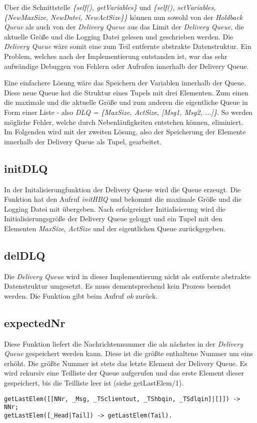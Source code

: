Über die Schnittstelle \textit{\{self(), getVariables\}} und \textit{\{self(), setVariables, \{NewMaxSize, NewDatei, NewActSize\}\}} können nun sowohl von der \textit{Holdback Queue} als auch von der \textit{Delivery Queue} aus das Limit der \textit{Delivery Queue}, die aktuelle Größe und die Logging Datei gelesen und geschrieben werden. Die \textit{Delivery Queue} wäre somit eine zum Teil entfernte abstrakte Datenstruktur. 
Ein Problem, welches nach der Implementierung entstanden ist, war das sehr aufwändige Debuggen von Fehlern oder Aufrufen innerhalb der Delivery Queue. 

Eine einfachere Lösung wäre das Speichern der Variablen innerhalb der Queue. 
Diese neue Queue hat die Struktur eines Tupels mit drei Elementen. Zum einen die maximale und die aktuelle Größe und zum anderen die eigentliche Queue in Form einer Liste - also \textit{DLQ = \{MaxSize, ActSize, [Msg1, Msg2, ...]\}}. So werden mögliche Fehler, welche durch Nebenläufigkeiten entstehen können, eliminiert. \\
Im Folgenden wird mit der zweiten Lösung, also der Speicherung der Elemente innerhalb der Delivery Queue als Tupel, gearbeitet.

\subsection{initDLQ}

In der Initalisierungfunktion der Delivery Queue wird die Queue erzeugt. Die Funktion hat den Aufruf \textit{initHBQ} und bekommt die maximale Größe und die Logging Datei mit übergeben. 
Nach erfolgreicher Initialisierung wird die Initialisierungsgröße der Delivery Queue geloggt und ein Tupel mit den Elementen \textit{MaxSize}, \textit{ActSize} und der eigentlichen Queue zurückgegeben.

\subsection{delDLQ}

Die \textit{Delivery Queue} wird in dieser Implementierung nicht als entfernte abstrakte Datenstruktur umgesetzt. Es muss dementsprechend kein Prozess beendet werden. Die Funktion gibt beim Aufruf \textit{ok} zurück.

\subsection{expectedNr}

Diese Funktion liefert die Nachrichtennummer die als nächstes in der \textit{Delivery Queue} gespeichert werden kann. Diese ist die größte enthaltene Nummer um eins erhöht. Die größte Nummer ist stets das letzte Element der Delivery Queue. Es wird rekursiv eine Teilliste der Queue aufgerufen und das erste Element dieser gespeichert, bis die Teilliste leer ist (siehe getLastElem/1). 
\begin{lstlisting} 
getLastElem([[NNr, _Msg, _TSclientout, _TShbqin, _TSdlqin]|[]]) -> NNr;
getLastElem([_Head|Tail]) -> getLastElem(Tail).
\end{lstlisting}

